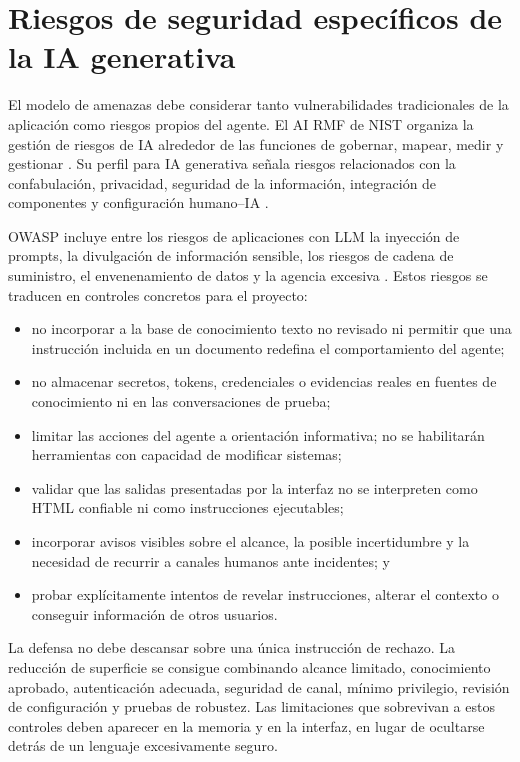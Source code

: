 \section{Riesgos de seguridad específicos de la IA generativa}
\label{sec:riesgos-ia-generativa}

El modelo de amenazas debe considerar tanto vulnerabilidades tradicionales de la
aplicación como riesgos propios del agente. El AI RMF de NIST organiza la gestión
de riesgos de IA alrededor de las funciones de gobernar, mapear, medir y
gestionar \cite{nistAiRmf2023}. Su perfil para IA generativa señala riesgos
relacionados con la confabulación, privacidad, seguridad de la información,
integración de componentes y configuración humano--IA \cite{nistGenAi2024}.

OWASP incluye entre los riesgos de aplicaciones con LLM la inyección de prompts,
la divulgación de información sensible, los riesgos de cadena de suministro, el
envenenamiento de datos y la agencia excesiva \cite{owaspLlm2026}. Estos riesgos
se traducen en controles concretos para el proyecto:

\begin{itemize}
  \item no incorporar a la base de conocimiento texto no revisado ni permitir que
  una instrucción incluida en un documento redefina el comportamiento del agente;
  \item no almacenar secretos, tokens, credenciales o evidencias reales en
  fuentes de conocimiento ni en las conversaciones de prueba;
  \item limitar las acciones del agente a orientación informativa; no se
  habilitarán herramientas con capacidad de modificar sistemas;
  \item validar que las salidas presentadas por la interfaz no se interpreten como
  HTML confiable ni como instrucciones ejecutables;
  \item incorporar avisos visibles sobre el alcance, la posible incertidumbre y
  la necesidad de recurrir a canales humanos ante incidentes; y
  \item probar explícitamente intentos de revelar instrucciones, alterar el
  contexto o conseguir información de otros usuarios.
\end{itemize}

La defensa no debe descansar sobre una única instrucción de rechazo. La reducción
de superficie se consigue combinando alcance limitado, conocimiento aprobado,
autenticación adecuada, seguridad de canal, mínimo privilegio, revisión de
configuración y pruebas de robustez. Las limitaciones que sobrevivan a estos
controles deben aparecer en la memoria y en la interfaz, en lugar de ocultarse
detrás de un lenguaje excesivamente seguro.

